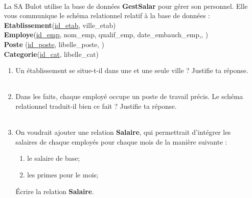\documentclass[a4paper,12pt]{article}
\begin{document}

\exo{}\\

La SA Bulot utilise la base de données \textbf{GestSalar} pour gérer son personnel. Elle vous communique le schéma relationnel relatif à la base de données :\\

\textbf{Etablissement}(\uline{id\_etab}, ville\_etab)\\

\textbf{Employe}(\uline{id\_emp}, nom\_emp, qualif\_emp, date\_embauch\_emp,, )\\

\textbf{Poste} (\uline{id\_poste}, libelle\_poste, )\\

\textbf{Categorie}(\uline{id\_cat}, libelle\_cat)\\

\begin{enumerate}[\bfseries 1.]
	\item 	Un établissement se situe-t-il dans une et une seule ville ? Justifie ta réponse.\\

    \\
	\item 	Dans les faits, chaque employé occupe un poste de travail précis. Le schéma relationnel traduit-il bien ce fait ? Justifie ta réponse.\\

        \\

    \item   On voudrait ajouter une relation \textbf{Salaire}, qui permettrait d'intégrer les salaires de chaque employés pour chaque mois de la manière suivante :
            \begin{enumerate}[--]
            	\item 	le salaire de base;
            	\item 	les primes pour le mois;
            \end{enumerate}
            Écrire la relation \textbf{Salaire}.\\

                \\
\end{enumerate}
\end{document}
